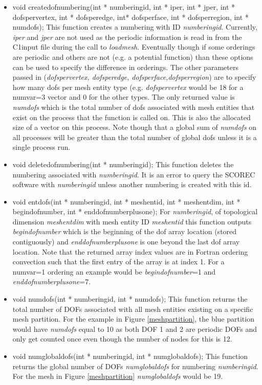 \begin{itemize}
\item   void createdofnumbering(int * numberingid, int * iper, int * jper,
                           int * dofspervertex, int * dofsperedge, 
                           int* dofsperface, int * dofsperregion, int * numdofs);
 This function creates a numbering with  ID \textit{numberingid}.  Currently, \textit{iper}
and \textit{jper} are not used as the periodic information is read in from the C1input file during the 
call to \textit{loadmesh}.
Eventually though if some orderings are periodic and others are not (e.g. a potential function)
than these options can be used to specify the difference in orderings. The other parameters
passed in (\textit{dofspervertex, dofsperedge, dofsperface,dofsperregion}) are to specify
how many dofs per mesh entity type (e.g. \textit{dofspervertex} would be 18 for a numvar=3 
vector and 0 for the other types.  The only returned value is \textit{numdofs} 
which is the total number of dofs associated with mesh entities that exist on the process that
the function is called on. This is also the allocated size of a vector on this process.  Note
though that a global sum of \textit{numdofs} on all processes will be greater than the total number
of global dofs unless it is a single process run. 

\item void deletedofnumbering(int * numberingid);
This function deletes the numbering associated with \textit{numberingid}.  It is an error
to query the SCOREC software with \textit{numberingid} unless another numbering is created
with this id.


\item  void entdofs(int * numberingid, int * meshentid, int * meshentdim,
               int * begindofnumber, int * enddofnumberplusone);
     For \textit{numberingid}, of topological dimension \textit{meshentdim} with mesh entity
ID \textit{meshentid} this function outputs \textit{begindofnumber} which is the beginning of
the dof array location (stored contiguously) and \textit{enddofnumberplusone} is one
beyond the last dof array location.  Note that the returned array index values are in Fortran
ordering convection such that the first entry of the array is at index 1.
For a numvar=1 ordering an example would be \textit{begindofnumber}=1
and \textit{enddofnumberplusone}=7. 

\item  void numdofs(int * numberingid, int * numdofs); This function returns the total number of 
DOFs associated with all mesh entities existing on a specific mesh partition.  For the example
in Figure \ref{meshpartition}, the blue partition would have \textit{numdofs} equal to 10 as both DOF 1
and 2 are periodic DOFs and only get counted once even though the number of nodes for this 
is 12.
  
\item  void numglobaldofs(int * numberingid, int * numglobaldofs);
This function returns the global number of DOFs \textit{numglobaldofs} for numbering \textit{numberingid}. 
 For the mesh in Figure \ref{meshpartition} \textit{numglobaldofs} would be 19.

\end{itemize}
